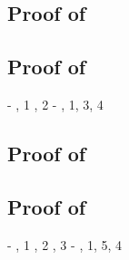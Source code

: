 \subsection*{Proof of }

\begin{derivation}
\end{derivation}



\subsection*{Proof of }

\begin{derivation}
     {\hyp}
     {\Rcxaxmono, 1}
     {\Retrue, 2}
     {\hyp}
     {\Reif, 1, 3, 4}
\end{derivation}



\subsection*{Proof of }

\begin{derivation}
\end{derivation}



\subsection*{Proof of }

\begin{derivation}
     {\hyp}
     {\Renega, 1}
     {\Rcxaxmono, 2}
     {\Retrue, 3}
     {\hyp}
     {\Reif, 1, 5, 4}
\end{derivation}



